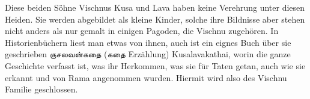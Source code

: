 \documentclass{article}
\newcommand{\TamilText}[1]{\texttamil{#1}}
\newcommand{\tam}[1]{\TamilText{#1}}
\begin{document}
Diese beiden Söhne Vischnus Kusa und Lava haben keine Verehrung unter diesen Heiden. Sie werden abgebildet als kleine Kinder, solche ihre Bildnisse aber stehen nicht anders als nur gemalt in einigen Pagoden, die Vischnu zugehören. In Historienbüchern liest man etwas von ihnen, auch ist ein eignes Buch über sie geschrieben \tam{குசலவன்கதை} (\tam{கதை} Erzählung) Kusalavakathai, worin die ganze Geschichte verfasst ist, was ihr Herkommen, was sie für Taten getan, auch wie sie erkannt und von Rama angenommen wurden. Hiermit wird also des Vischnu Familie geschlossen.

\begin{center}
\end{center}
\paragraph{}
\end{document}
